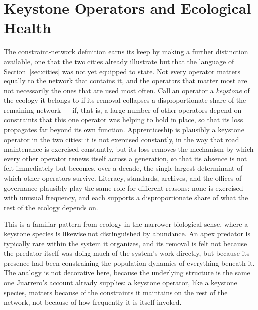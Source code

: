 \documentclass[11pt]{article}
\begin{document}
\section{Keystone Operators and Ecological Health}\label{sec:keystone}

The constraint-network definition earns its keep by making a further
distinction available, one that the two cities already illustrate but
that the language of Section~\ref{sec:cities} was not yet equipped to
state. Not every operator matters equally to the network that
contains it, and the operators that matter most are not necessarily
the ones that are used most often. Call an operator a \emph{keystone}
of the ecology it belongs to if its removal collapses a
disproportionate share of the remaining network --- if, that is, a
large number of other operators depend on constraints that this one
operator was helping to hold in place, so that its loss propagates
far beyond its own function. Apprenticeship is plausibly a keystone
operator in the two cities: it is not exercised constantly, in the way
that road maintenance is exercised constantly, but its loss removes
the mechanism by which every other operator renews itself across a
generation, so that its absence is not felt immediately but becomes,
over a decade, the single largest determinant of which other operators
survive. Literacy, standards, archives, and the offices of governance
plausibly play the same role for different reasons: none is exercised
with unusual frequency, and each supports a disproportionate share of
what the rest of the ecology depends on.

This is a familiar pattern from ecology in the narrower biological
sense, where a keystone species is likewise not distinguished by
abundance. An apex predator is typically rare within the system it
organizes, and its removal is felt not because the predator itself
was doing much of the system's work directly, but because its
presence had been constraining the population dynamics of everything
beneath it. The analogy is not decorative here, because the underlying
structure is the same one Juarrero's account already supplies: a
keystone operator, like a keystone species, matters because of the
constraints it maintains on the rest of the network, not because of
how frequently it is itself invoked.
\end{document}
